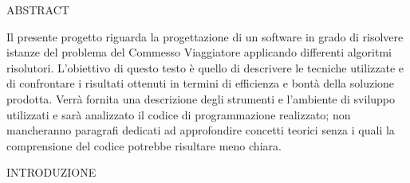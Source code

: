 \documentclass[11pt]{article}
\begin{document}
ABSTRACT

\vspace{2\baselineskip}

Il presente progetto riguarda la progettazione di un software in grado di risolvere istanze del problema del Commesso Viaggiatore applicando differenti algoritmi risolutori. L'obiettivo di questo testo \`e quello di descrivere le tecniche utilizzate e di confrontare i risultati ottenuti in termini di efficienza e bont\`a della soluzione prodotta. Verr\`a fornita una descrizione degli strumenti e l'ambiente di sviluppo utilizzati e sar\`a analizzato il codice di programmazione realizzato; non mancheranno paragrafi dedicati ad approfondire concetti teorici senza i quali la comprensione del codice potrebbe risultare meno chiara. 

\vspace{2\baselineskip}
INTRODUZIONE 

\vspace{2\baselineskip}
\end{document}
